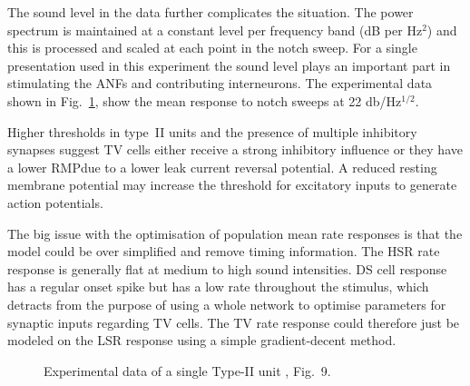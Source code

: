 
The sound level in the \citet{ReissYoung:2005} data further complicates the
situation.  The power spectrum is maintained at a constant level per frequency
band (dB per Hz$^2$) and this is processed and scaled at each point in the notch
sweep.  For a single presentation used in this experiment the sound level plays
an important part in stimulating the ANFs and contributing interneurons.  The
experimental data shown in Fig.~\ref{fig:TVReissFig9}, show the mean response to
notch sweeps at 22 db/Hz$^{1/2}$.


Higher thresholds in type~II \DCN units \citep{SpirouDavisEtAl:1999} and the
presence of multiple inhibitory synapses \citep{Alibardi:2006} suggest TV cells
either receive a strong inhibitory influence or they have a lower RMP\@ due to a
lower leak current reversal potential. A reduced resting membrane potential may
increase the threshold for excitatory inputs to generate action potentials.



The big issue with the optimisation of population mean rate responses is that
the model could be over simplified and remove timing information.  The HSR rate
response is generally flat at medium to high sound intensities. DS cell response has a regular onset spike but
has a low rate throughout the stimulus, which detracts from the purpose of using a whole
network to optimise parameters for synaptic inputs regarding TV cells.  The TV
rate response could therefore just be modeled on the LSR response using a simple
gradient-decent method. 
 

\begin{figure}[htb]
  \centering
  \caption{Experimental data of a single Type-II \DCN unit
    \citep{ReissYoung:2005}, Fig.~9.}
  \label{fig:TVReissFig9}
\end{figure}


